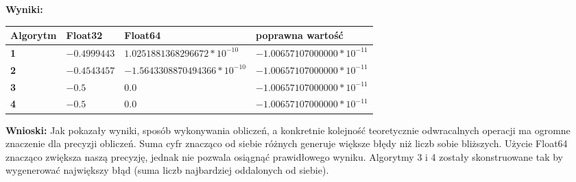 \documentclass{article}
\begin{document}
\noindent \textbf{Wyniki:}
\begin{center}
  \begin{tabular}{|p{}|p{3cm}|p{5cm}|p{5cm}|} \hline
    \textbf{Algorytm} & \textbf{Float32} & \textbf{Float64} & \textbf{poprawna wartość} \\
    \hline
    \textbf{1} & $-0.4999443$ & $1.0251881368296672*10^{-10}$ & $-1.00657107000000*10^{-11}$ \\
    \hline
    \textbf{2} & $-0.4543457$ & $-1.5643308870494366*10^{-10}$ &  $-1.00657107000000*10^{-11}$ \\
    \hline
    \textbf{3} & $-0.5$ & $0.0$ & $-1.00657107000000*10^{-11}$ \\
    \hline
    \textbf{4} & $-0.5$ & $0.0$ & $-1.00657107000000*10^{-11}$ \\
    \hline
  \end{tabular}
\end{center}
\noindent \textbf{Wnioski:} Jak pokazały wyniki, sposób wykonywania obliczeń, a konkretnie kolejność teoretycznie  odwracalnych operacji ma ogromne znaczenie dla precyzji obliczeń. Suma cyfr znacząco od siebie różnych generuje większe błędy niż liczb sobie bliższych. Użycie Float64 znacząco zwiększa naszą precyzję, jednak nie pozwala osiągnąć prawidłowego wyniku. Algorytmy 3 i 4 zostały skonstruowane tak by wygenerować największy błąd (suma liczb najbardziej oddalonych od siebie).
\end{document}
